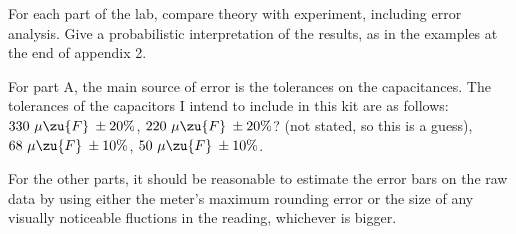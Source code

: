For each part of the lab, compare theory with experiment, including error analysis.
Give a probabilistic interpretation of the results, as in the examples at the end of appendix 2.

For part A, the main source of error is the tolerances on
the capacitances.
The tolerances of the capacitors I intend to include in this kit are as
follows:
$330\ \mu\zu{F}\:\pm 20\%$,
$220\ \mu\zu{F}\:\pm 20\%$? (not stated, so this is a guess),
$68\ \mu\zu{F}\:\pm 10\%$,
$50\ \mu\zu{F}\:\pm 10\%$. 

For the other parts, it should be reasonable to estimate the error bars on the raw
data by using either the meter's maximum rounding error or the size of any visually
noticeable fluctions in the reading, whichever is bigger.

